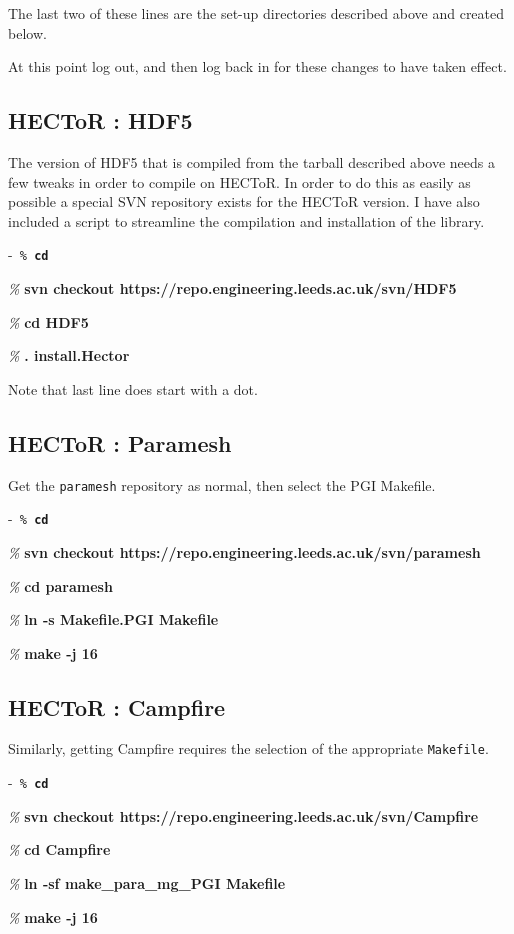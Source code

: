 \documentclass[paper=a4, fontsize=11pt,twoside,bibtotoc]{scrartcl}		%
\newenvironment{codebox}{\begin{center}\begin{MakeFramed}{\hsize0.99\linewidth\advance\hsize-\width\FrameRestore}\tt}{\end{MakeFramed}\end{center}}
\newcommand{\prompt}[1]{\textsl{\%} \textbf{#1}}
\begin{document}
The last two of these lines are the set-up directories described above and created below.

At this point log out, and then log back in for these changes to have taken effect.

\subsection[HDF5]{HECToR : HDF5}

The version of HDF5 that is compiled from the tarball described above needs a few tweaks in order to compile on HECToR.  In order to do this as easily as 
possible a special SVN repository exists for the HECToR version.  I have also included a script to streamline the compilation and installation of the library.
\begin{codebox}
	\prompt{cd}

        \prompt{svn checkout https://repo.engineering.leeds.ac.uk/svn/HDF5}

        \prompt{cd HDF5}

        \prompt{. install.Hector}
\end{codebox}
Note that last line does start with a dot.

\subsection[Paramesh]{HECToR : Paramesh}

Get the \texttt{paramesh} repository as normal, then select the PGI Makefile.
\begin{codebox}
        \prompt{cd}

        \prompt{svn checkout https://repo.engineering.leeds.ac.uk/svn/paramesh}

	\prompt{cd paramesh}

	\prompt{ln -s Makefile.PGI Makefile}

	\prompt{make -j 16}
\end{codebox}

\subsection[Campfire]{HECToR : Campfire}

Similarly, getting Campfire requires the selection of the appropriate \texttt{Makefile}.
\begin{codebox}
        \prompt{cd}

        \prompt{svn checkout https://repo.engineering.leeds.ac.uk/svn/Campfire}

	\prompt{cd Campfire}

        \prompt{ln -sf make\_para\_mg\_PGI Makefile}

        \prompt{make -j 16}
\end{codebox}
\end{document}
